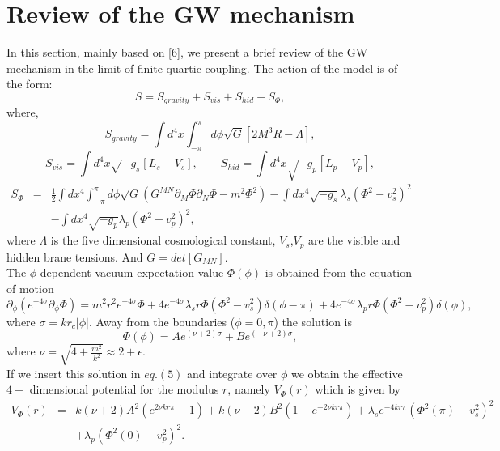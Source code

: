 \documentclass[12pt]{article}
\begin{document}
\section {Review of the GW mechanism}
In this section, mainly based on [6], we present a brief review of the GW mechanism in the limit of finite quartic coupling. The action of the model is  of the form:
\begin{equation}
S=S_{gravity}+S_{vis}+ S_{hid}+ S_{\Phi},
\end{equation}
where,
\begin{equation}
S_{gravity}=\int d^4x\int^\pi_{-\pi}d\phi\sqrt{G}[2M^3R-\Lambda],
\end{equation}
 \begin{equation}
 S_{vis}=\int d^4x\sqrt{-g_s}[L_s-V_s],\qquad
 S_{hid}=\int d^4x\sqrt{-g_p}[L_p-V_p],
 \end{equation}
\begin{eqnarray}
S_{\Phi}&=&\frac{1}{2}\int
dx^4\int^\pi_{-\pi}d\phi\sqrt{G}(G^{MN}\partial_M\Phi\partial_N\Phi
-m^2 \Phi^2) -\int
 dx^4\sqrt{-g_s}\lambda_s(\Phi^2-v^2_s)^2\nonumber\\
 &&-\int
dx^4\sqrt{-g_p}\lambda_p(\Phi^2-v^2_p)^2,
\end{eqnarray}
where  $\Lambda$ is the five dimensional cosmological constant,
$V_s$,$V_p$ are the visible and hidden brane tensions. And
$G=det[G_{MN}]$.\\
The $\phi$-dependent vacuum expectation value $\Phi(\phi)$ is
obtained
 from the equation of motion
\begin{equation}
\partial_\phi(e^{-4\sigma}\partial_\phi \Phi)=m^2
r^2e^{-4\sigma}\Phi+ 4e^{-4\sigma}\lambda_s r
\Phi(\Phi^2-v^2_s)\delta(\phi-\pi)+4e^{-4\sigma}\lambda_p r
\Phi(\Phi^2-v^2_p)\delta(\phi),
\end{equation}
where $\sigma = k r_{c} | \phi |$. Away from the boundaries ($\phi=0,\pi$) the solution is
\begin{equation}
\Phi(\phi)=Ae^{(\nu+2)\sigma}+Be^{(-\nu+2)\sigma},
\end{equation}
where $\nu=\sqrt{4+\frac{m^2}{k^2}}\approx 2+\epsilon$.\\ If we
insert this solution in $eq. (5)$ and integrate over $\phi$ we
obtain the effective $4-$ dimensional potential for the modulus $r$,
namely $V_{\Phi}(r)$ which is given by
\begin{eqnarray}
 V_{\Phi}(r)&=&k(\nu+2)A^2(e^{2\nu k r\pi}-1)+
        k(\nu-2)B^2(1-e^{-2\nu k r\pi})+
\lambda_se^{-4 k r\pi}(\Phi^2(\pi)-v^2_s)^2\nonumber\\
&&+\lambda_p(\Phi^2(0)-v^2_p)^2.
\end{eqnarray}
\end{document}
